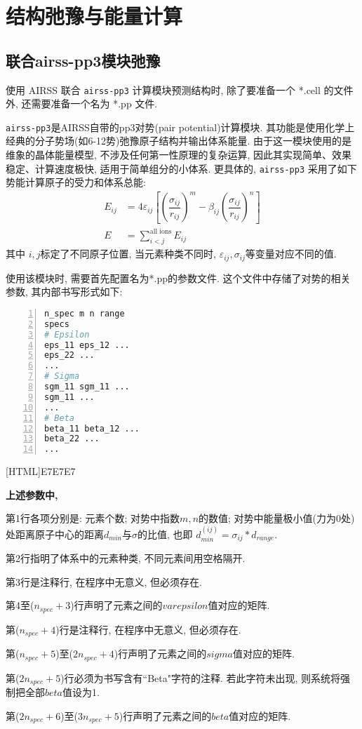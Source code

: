 \documentclass[a4paper, 10pt]{article}
\begin{document}
\section{结构弛豫与能量计算}

\subsection{联合airss-pp3模块弛豫}
使用 AIRSS 联合 \verb|airss-pp3| 计算模块预测结构时, 除了要准备一个 *.cell 的文件外, 还需要准备一个名为 *.pp 文件. 

\verb|airss-pp3|是AIRSS自带的pp3对势(pair potential)计算模块. 其功能是使用化学上经典的分子势场(如6-12势)弛豫原子结构并输出体系能量. 由于这一模块使用的是维象的晶体能量模型, 不涉及任何第一性原理的复杂运算, 因此其实现简单、效果稳定、计算速度极快, 适用于简单组分的小体系. 更具体的, \verb|airss-pp3| 采用了如下势能计算原子的受力和体系总能:
\begin{subequations}
  \label{eq:pp3}
  \begin{align}
    E_{ij} &= 4\varepsilon_{ij}\left[\left(\dfrac{\sigma_{ij}}{r_{ij}}\right)^m -\beta_{ij}\left(\dfrac{\sigma_{ij}}{r_{ij}}\right)^n\right]\\
    E &= \sum_{i<j}^{\text{all ions}} E_{ij}
  \end{align}
\end{subequations}
其中 \(i,j\)标定了不同原子位置, 当元素种类不同时, \(\varepsilon_{ij},\sigma_{ij}\)等变量对应不同的值.

使用该模块时, 需要首先配置名为*.pp的参数文件. 这个文件中存储了对势的相关参数, 其内部书写形式如下: 
\begin{lstlisting}[language={bash},numbers=left]
n_spec m n range
specs
# Epsilon
eps_11 eps_12 ...
eps_22 ...
...
# Sigma
sgm_11 sgm_11 ... 
sgm_11 ... 
...
# Beta
beta_11 beta_12 ...
beta_22 ...
...
\end{lstlisting}

\noindent{}[HTML]{E7E7E7}{\parbox{\textwidth}{%
\noindent \textbf{上述参数中, }
\begin{maineu}
  \item 第1行各项分别是: 元素个数; 对势中指数\(m,n\)的数值; 对势中能量极小值(力为0处)处距离原子中心的距离\(d_{min}\)与\(\sigma\)的比值, 也即 \(d_{min}^{(ij)} = \sigma_{ij}*d_{range}\). 
  \item 第2行指明了体系中的元素种类, 不同元素间用空格隔开. 
  \item 第3行是注释行, 在程序中无意义, 但必须存在. 
  \item 第4至(\(n_{spec}+3\))行声明了元素之间的\(varepsilon\)值对应的矩阵.
  \item 第(\(n_{spec}+4\))行是注释行, 在程序中无意义, 但必须存在. 
  \item 第(\(n_{spec}+5\))至(\(2n_{spec}+4\))行声明了元素之间的\(sigma\)值对应的矩阵.
  \item 第(\(2n_{spec}+5\))行必须为书写含有``Beta"字符的注释. 若此字符未出现, 则系统将强制把全部\(beta\)值设为1.
  \item 第(\(2n_{spec}+6\))至(\(3n_{spec}+5\))行声明了元素之间的\(beta\)值对应的矩阵.
\end{maineu}}}\\
\end{document}

